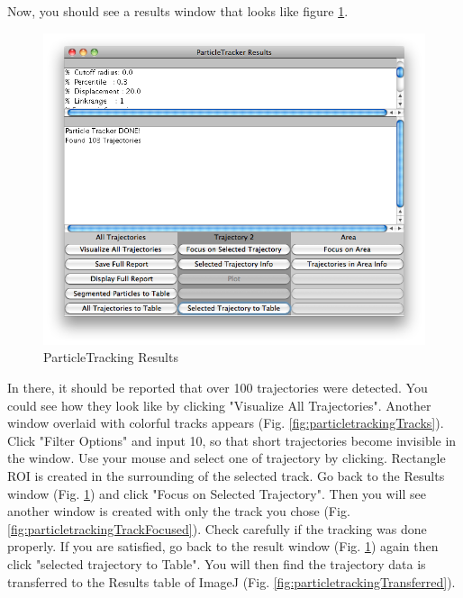 \documentclass[11pt,a4paper,oneside]{report}
\begin{document}
Now, you should see a results window that looks like figure \ref{fig:particletrackingresults}.
\begin{figure}[htbp]
\begin{center}
\includegraphics[scale=0.45]{fig/fig253_ParticleTrackerResults.png}
\caption{ParticleTracking Results}
\label{fig:particletrackingresults}
\end{center}
\end{figure}
In there, it should be reported that over 100 trajectories were detected. You could see how they look like by clicking "Visualize All Trajectories". 
Another window overlaid with colorful tracks appears 
(Fig. \ref{fig:particletrackingTracks}). 
Click "Filter Options" and input 10, so that short trajectories become invisible in the window. 
Use your mouse and select one of trajectory by clicking. 
Rectangle ROI is created in the surrounding of the selected track. 
Go back to the Results window (Fig. \ref{fig:particletrackingresults}) 
and click "Focus on Selected Trajectory". 
Then you will see another window is created with only the track you chose 
(Fig. \ref{fig:particletrackingTrackFocused}). 
Check carefully if the tracking was done properly. 
If you are satisfied, go back to the result window (Fig. \ref{fig:particletrackingresults}) 
again then click "selected trajectory to Table". 
You will then find the trajectory data is transferred to the Results table of ImageJ 
(Fig. \ref{fig:particletrackingTransferred}). 
 
\end{document}
